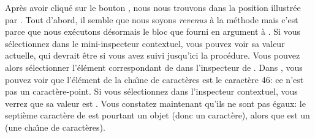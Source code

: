 \documentclass[a4paper,10pt,twoside]{book}
\begin{document}
Apr\`es avoir cliqu\'e sur le bouton , 
nous nous trouvons dans la position illustr\'ee par .
Tout d'abord, il semble que nous soyons \emph{revenus} \`a la m\'ethode 
 mais c'est parce que nous ex\'ecutons d\'esormais le bloc
que  fourni en argument \`a .
Si vous s\'electionnez  dans le mini-inspecteur contextuel, 
vous pouvez voir sa valeur actuelle, qui devrait \^etre  
si vous avez suivi jusqu'ici la proc\'edure.
Vous pouvez alors s\'electionner l'\'el\'ement correspondant de \self
dans l'inspecteur de \self.
Dans , vous pouvez voir que l'\'el\'ement
 de la cha\^{\i}ne de caract\`eres est le caract\`ere 46: ce
n'est pas un caract\`ere-point.
Si vous s\'electionnez  dans l'inspecteur contextuel, 
vous verrez que sa valeur est .
Vous constatez maintenant qu'ils ne sont pas \'egaux: le septi\`eme caract\`ere
de  est pourtant un objet  (donc un caract\`ere), alors que  est un  (\ie une cha\^{\i}ne de caract\`eres).
\end{document}
